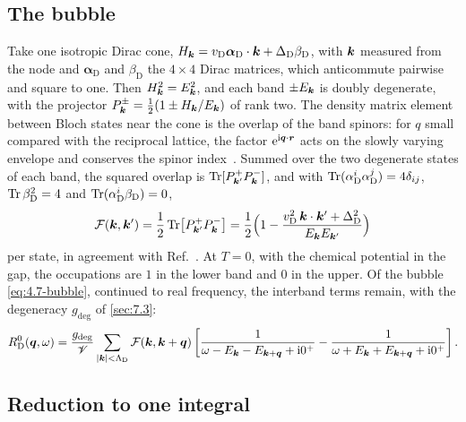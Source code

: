 \subsection*{The bubble}

Take one isotropic Dirac cone, $H_{\bm{k}} = v_{\mathrm{D}}\boldsymbol{\alpha}_{\mathrm{D}}\cdot\bm{k} + \Delta_{\mathrm{D}}\beta_{\mathrm{D}}$, with $\bm{k}$ measured from the node and $\boldsymbol{\alpha}_{\mathrm{D}}$ and $\beta_{\mathrm{D}}$ the $4\times4$ Dirac matrices, which anticommute pairwise and square to one. Then $H_{\bm{k}}^2 = E_{\bm{k}}^2$, and each band $\pm E_{\bm{k}}$ is doubly degenerate, with the projector $P^\pm_{\bm{k}} = \frac12(1 \pm H_{\bm{k}}/E_{\bm{k}})$ of rank two. The density matrix element between Bloch states near the cone is the overlap of the band spinors: for $q$ small compared with the reciprocal lattice, the factor $\mathrm{e}^{\mathrm{i}\bm{q}\cdot\bm{r}}$ acts on the slowly varying envelope and conserves the spinor index~\cite[App.~A.3]{hochberg2018detection}. Summed over the two degenerate states of each band, the squared overlap is $\operatorname{Tr}[P^+_{\bm{k}'}P^-_{\bm{k}}]$, and with $\operatorname{Tr}(\alpha_{\mathrm{D}}^i\alpha_{\mathrm{D}}^j) = 4\delta_{ij}$, $\operatorname{Tr}\beta_{\mathrm{D}}^2 = 4$ and $\operatorname{Tr}(\alpha_{\mathrm{D}}^i\beta_{\mathrm{D}}) = 0$,
\begin{equation}
  \mathcal{F}(\bm{k},\bm{k}') = \frac12\operatorname{Tr}\bigl[P^+_{\bm{k}'}P^-_{\bm{k}}\bigr] = \frac12\Bigl(1 - \frac{v_{\mathrm{D}}^2\,\bm{k}\cdot\bm{k}' + \Delta_{\mathrm{D}}^2}{E_{\bm{k}}E_{\bm{k}'}}\Bigr)
  \label{eq:D.22-F}
\end{equation}
per state, in agreement with Ref.~\cite[Eq.~(A.7)]{hochberg2018detection}. At $T = 0$, with the chemical potential in the gap, the occupations are $1$ in the lower band and $0$ in the upper. Of the bubble \cref{eq:4.7-bubble}, continued to real frequency, the interband terms remain, with the degeneracy $g_{\mathrm{deg}}$ of \cref{sec:7.3}:
\begin{equation*}
  R^0_{\mathrm{D}}(\bm{q},\omega) = \frac{g_{\mathrm{deg}}}{\mathscr{V}}\sum_{|\bm{k}| < \Lambda_{\mathrm{D}}}\mathcal{F}(\bm{k},\bm{k}+\bm{q})\left[\frac{1}{\omega - E_{\bm{k}} - E_{\bm{k}+\bm{q}} + \mathrm{i}0^+} - \frac{1}{\omega + E_{\bm{k}} + E_{\bm{k}+\bm{q}} + \mathrm{i}0^+}\right] .
\end{equation*}

\subsection*{Reduction to one integral}

